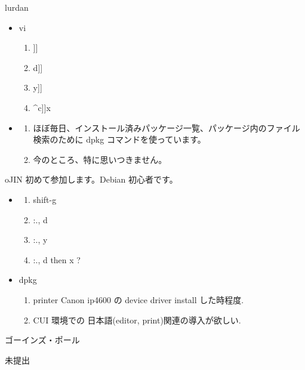 \documentclass[mingoth,a4paper]{jsarticle}
\begin{document}
\begin{prework}{ lurdan }
  \begin{itemize}
  \item vi
    \begin{enumerate}
    \item ]]
    \item d]]
    \item y]]
    \item \textasciicircum c]]x
    \end{enumerate}
  \item
    \begin{enumerate}
    \item ほぼ毎日、インストール済みパッケージ一覧、パッケージ内のファイル検索のために dpkg コマンドを使っています。
    \item 今のところ、特に思いつきません。
    \end{enumerate}
  \end{itemize}
\end{prework}

\begin{prework}{ oJIN }
初めて参加します。Debian 初心者です。
  \begin{itemize}
  \item
    \begin{enumerate}
    \item shift-g
    \item :., \textdollar d
    \item :., \textdollar y
    \item :., \textdollar d then x ?
    \end{enumerate}
  \item dpkg
    \begin{enumerate}
    \item printer Canon ip4600 の device driver install した時程度.
    \item CUI 環境での 日本語(editor, print)関連の導入が欲しい.
    \end{enumerate}
  \end{itemize}
\end{prework}

\begin{prework}{ ゴーインズ・ポール }

未提出

\end{prework}



\clearpage
\end{document}
